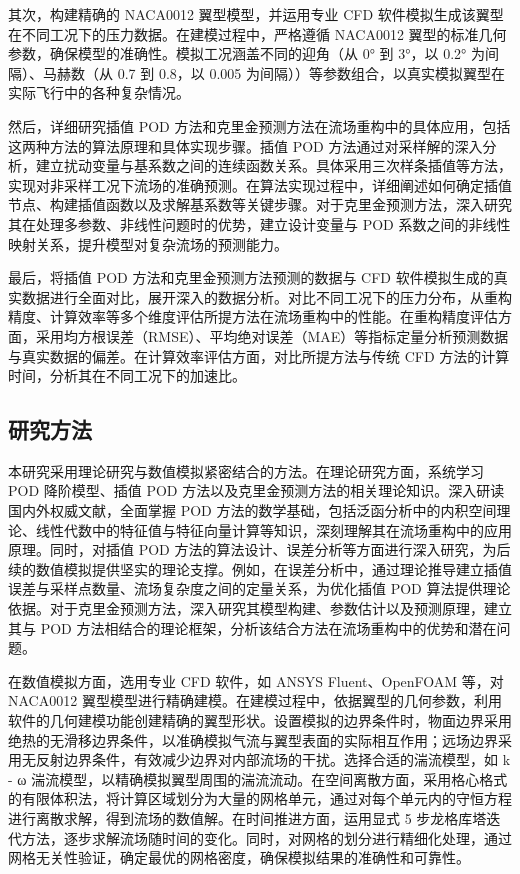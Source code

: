 其次，构建精确的 NACA0012 翼型模型，并运用专业 CFD 软件模拟生成该翼型在不同工况下的压力数据。在建模过程中，严格遵循 NACA0012 翼型的标准几何参数，确保模型的准确性。模拟工况涵盖不同的迎角（从 0° 到 3°，以 0.2° 为间隔）、马赫数（从 0.7 到 0.8，以 0.005 为间隔））等参数组合，以真实模拟翼型在实际飞行中的各种复杂情况。

然后，详细研究插值 POD 方法和克里金预测方法在流场重构中的具体应用，包括这两种方法的算法原理和具体实现步骤。插值 POD 方法通过对采样解的深入分析，建立扰动变量与基系数之间的连续函数关系。具体采用三次样条插值等方法，实现对非采样工况下流场的准确预测。在算法实现过程中，详细阐述如何确定插值节点、构建插值函数以及求解基系数等关键步骤。对于克里金预测方法，深入研究其在处理多参数、非线性问题时的优势，建立设计变量与 POD 系数之间的非线性映射关系，提升模型对复杂流场的预测能力。


最后，将插值 POD 方法和克里金预测方法预测的数据与 CFD 软件模拟生成的真实数据进行全面对比，展开深入的数据分析。对比不同工况下的压力分布，从重构精度、计算效率等多个维度评估所提方法在流场重构中的性能。在重构精度评估方面，采用均方根误差（RMSE）、平均绝对误差（MAE）等指标定量分析预测数据与真实数据的偏差。在计算效率评估方面，对比所提方法与传统 CFD 方法的计算时间，分析其在不同工况下的加速比。

\subsection{研究方法}
本研究采用理论研究与数值模拟紧密结合的方法。在理论研究方面，系统学习 POD 降阶模型、插值 POD 方法以及克里金预测方法的相关理论知识。深入研读国内外权威文献，全面掌握 POD 方法的数学基础，包括泛函分析中的内积空间理论、线性代数中的特征值与特征向量计算等知识，深刻理解其在流场重构中的应用原理。同时，对插值 POD 方法的算法设计、误差分析等方面进行深入研究，为后续的数值模拟提供坚实的理论支撑。例如，在误差分析中，通过理论推导建立插值误差与采样点数量、流场复杂度之间的定量关系，为优化插值 POD 算法提供理论依据。对于克里金预测方法，深入研究其模型构建、参数估计以及预测原理，建立其与 POD 方法相结合的理论框架，分析该结合方法在流场重构中的优势和潜在问题。

在数值模拟方面，选用专业 CFD 软件，如 ANSYS Fluent、OpenFOAM 等，对 NACA0012 翼型模型进行精确建模。在建模过程中，依据翼型的几何参数，利用软件的几何建模功能创建精确的翼型形状。设置模拟的边界条件时，物面边界采用绝热的无滑移边界条件，以准确模拟气流与翼型表面的实际相互作用；远场边界采用无反射边界条件，有效减少边界对内部流场的干扰。选择合适的湍流模型，如 k - ω 湍流模型，以精确模拟翼型周围的湍流流动。在空间离散方面，采用格心格式的有限体积法，将计算区域划分为大量的网格单元，通过对每个单元内的守恒方程进行离散求解，得到流场的数值解。在时间推进方面，运用显式 5 步龙格库塔迭代方法，逐步求解流场随时间的变化。同时，对网格的划分进行精细化处理，通过网格无关性验证，确定最优的网格密度，确保模拟结果的准确性和可靠性。


